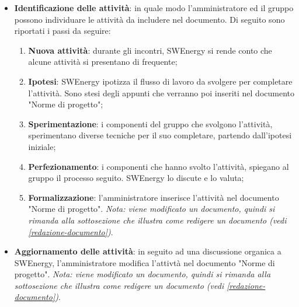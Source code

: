 \begin{itemize}
	\item \textbf{Identificazione delle attività}: in quale modo
	      l'amministratore ed il gruppo possono individuare le attività da
	      includere nel documento. Di seguito sono riportati i passi da
	      seguire:
	      \begin{enumerate}
		      \item \textbf{Nuova attività}: durante gli incontri,
		            SWEnergy si rende conto che alcune attività si
		            presentano di frequente;

		      \item \textbf{Ipotesi}: SWEnergy ipotizza il flusso di lavoro da
		            svolgere per completare l'attività. Sono stesi degli appunti
		            che verranno poi inseriti nel documento "Norme di progetto";

		      \item \textbf{Sperimentazione}: i componenti del gruppo che
		            svolgono l'attività, sperimentano diverse tecniche per
		            il suo completare, partendo dall'ipotesi iniziale;

		      \item \textbf{Perfezionamento}: i componenti che hanno
		            svolto l'attività, spiegano al gruppo il processo
		            seguito. SWEnergy lo discute e lo valuta;

		      \item \textbf{Formalizzazione}: l'amministratore inserisce
		            l'attività nel documento "Norme di progetto". \textit{Nota:
		            viene modificato un documento, quindi si rimanda alla
		            sottosezione che illustra come redigere un documento
		            (vedi \cref{redazione-documento})}.
	      \end{enumerate}

	\item \textbf{Aggiornamento delle attività}: in seguito ad una discussione
	      organica a SWEnergy, l'amministratore modifica l'attivtà
	      nel documento "Norme di progetto". \textit{Nota:
	      viene modificato un documento, quindi si rimanda alla
	      sottosezione che illustra come redigere un documento
	      (vedi \cref{redazione-documento})}.
\end{itemize}
